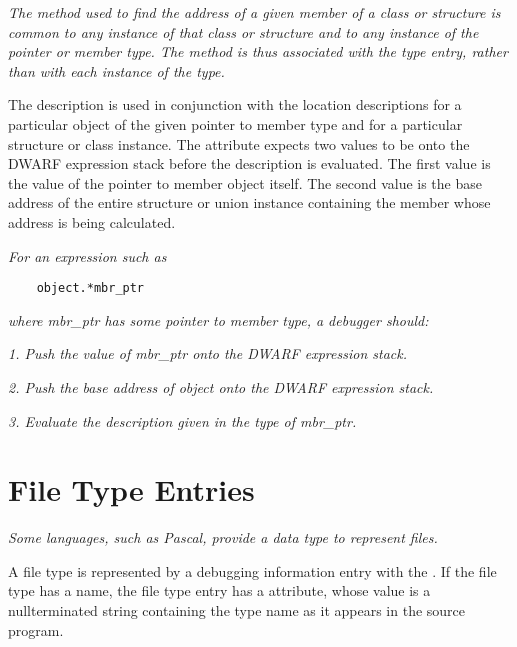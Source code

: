 \textit{The method used to find the address of a given member of a
class or structure is common to any instance of that class
or structure and to any instance of the pointer or member
type. The method is thus associated with the type entry,
rather than with each instance of the type.}

The  description is used in conjunction
with the location descriptions for a particular object of the
given pointer to member type and for a particular structure or
class instance. The  attribute expects two
values to be 
onto the DWARF expression stack before
the  description is evaluated. The first
value 
is the value of the pointer to member object
itself. The second value 
is the base address of the
entire structure or union instance containing the member
whose address is being calculated.

\textit{For an expression such as}

\begin{lstlisting}
    object.*mbr_ptr
\end{lstlisting}
\textit{where mbr\_ptr has some pointer to member type, a debugger should:}

\textit{1. Push the value of mbr\_ptr onto the DWARF expression stack.}

\textit{2. Push the base address of object onto the DWARF expression stack.}

\textit{3. Evaluate the  description 
given in the type of mbr\_ptr.}

\section{File Type Entries}
\label{chap:filetypeentries}

\textit{Some languages, such as Pascal, provide a data type to represent 
files.}

A file type is represented by a debugging information entry
with the 
. 
If the file type has a name,
the file type entry has a  attribute, whose value
is a null\dash terminated string containing the type name as it
appears in the source program.


